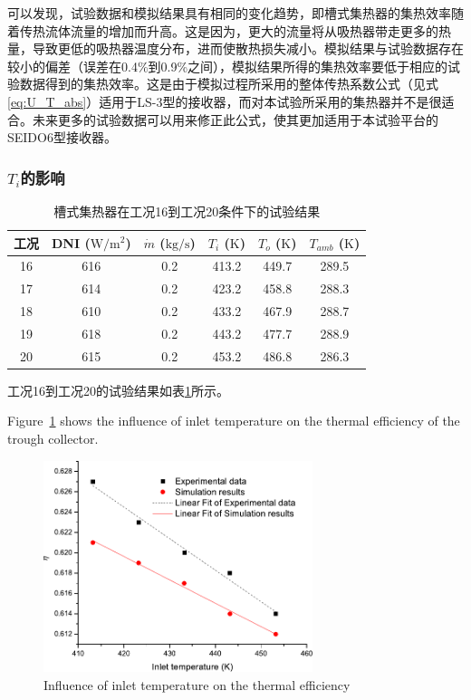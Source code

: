 可以发现，试验数据和模拟结果具有相同的变化趋势，即槽式集热器的集热效率随着传热流体流量的增加而升高。这是因为，更大的流量将从吸热器带走更多的热量，导致更低的吸热器温度分布，进而使散热损失减小。模拟结果与试验数据存在较小的偏差（误差在0.4\%到0.9\%之间），模拟结果所得的集热效率要低于相应的试验数据得到的集热效率。这是由于模拟过程所采用的整体传热系数公式（见式\ref{eq:U_T_abs}）适用于LS-3型的接收器，而对本试验所采用的集热器并不是很适合。未来更多的试验数据可以用来修正此公式，使其更加适用于本试验平台的SEIDO6型接收器。

\subsubsection{$T_i$的影响}

\begin{table}[htbp]\footnotesize
	\caption{槽式集热器在工况16到工况20条件下的试验结果}
	\begin{center}
	\begin{tabular}{cccccc}
		\toprule
		工况	& DNI ($\mathrm{W/m^2}$)	&	$\dot{m}$ ($\mathrm{kg/s}$)			&	$T_i$ ($\mathrm{K}$)	&	$T_o$ ($\mathrm{K}$)		&	$T_{amb}$ ($\mathrm{K}$)\\
		\midrule
		16	&	616	&	0.2	&	413.2	&	449.7	&	289.5\\
		17	&	614	&	0.2	&	423.2	&	458.8	&	288.3\\
		18	&	610	&	0.2	&	433.2	&	467.9	&	288.7	\\
		19	&	618	&	0.2	&	443.2	&	477.7	&	288.9\\
		20	&	615	&	0.2	&	453.2	&	486.8	&	286.3\\
		\bottomrule
	\end{tabular}
	\end{center}
	\label{tab:ResultOfTrough3}
\end{table}
工况16到工况20的试验结果如表\ref{tab:ResultOfTrough3}所示。

Figure~\ref{fig:T_i-eta-trough} shows the influence of inlet temperature on the thermal efficiency of the trough collector.
\begin{figure}[!ht]
\centering
\includegraphics[width=0.7\textwidth]{fig/T_i-eta-trough}
\caption{Influence of inlet temperature on the thermal efficiency}
\label{fig:T_i-eta-trough}
\end{figure}

